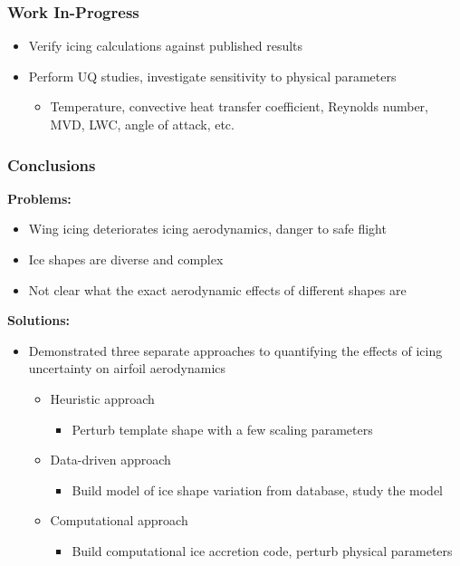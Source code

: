 \documentclass[9pt]{beamer}
\begin{document}
\begin{frame}
\frametitle{Work In-Progress}
\label{sec-4-6}

\begin{itemize}
\item Verify icing calculations against published results
\item Perform UQ studies, investigate sensitivity to physical parameters
\begin{itemize}
\item Temperature, convective heat transfer coefficient, Reynolds number, MVD, LWC, angle of attack, etc.
\end{itemize}
\end{itemize}
\end{frame}
\begin{frame}
\frametitle{Conclusions}
\label{sec-4-7}

\textbf{Problems:}
\begin{itemize}
\item Wing icing deteriorates icing aerodynamics, danger to safe flight
\item Ice shapes are diverse and complex
\item Not clear what the exact aerodynamic effects of different shapes are
\end{itemize}
\textbf{Solutions:}
\begin{itemize}
\item Demonstrated three separate approaches to quantifying the effects of
  icing uncertainty on airfoil aerodynamics
\begin{itemize}
\item Heuristic approach
\begin{itemize}
\item Perturb template shape with a few scaling parameters
\end{itemize}
\item Data-driven approach
\begin{itemize}
\item Build model of ice shape variation from database, study the model
\end{itemize}
\item Computational approach
\begin{itemize}
\item Build computational ice accretion code, perturb physical parameters
\end{itemize}
\end{itemize}
\end{itemize}
\end{frame}
\end{document}
